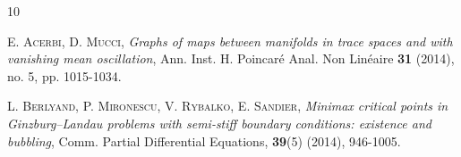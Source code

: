 \documentclass[12pt, a4paper]{article}
\newenvironment{proof}{\noindent\emph{Proof.}}{\hfill$\square$\medskip}
\newcommand{\R}{\mathbb{R}}
\renewcommand{\(}{\left(}
\renewcommand{\)}{\right)}
\begin{document}

\begin{thebibliography}{10}
\small

 \textsc{E. Acerbi, D. Mucci}, \emph{Graphs of maps between manifolds in trace spaces and with vanishing mean oscillation}, Ann. Inst. H. Poincaré Anal. Non Linéaire \textbf{31} (2014), no. 5, pp. 1015-1034.


 \textsc{L. Berlyand, P. Mironescu, V. Rybalko, E. Sandier}, \emph{Minimax critical points in Ginzburg–Landau problems with semi-stiff boundary conditions: existence and bubbling}, Comm. Partial Differential Equations, \textbf{39}(5) (2014), 946-1005.





\end{thebibliography}
\end{document}

